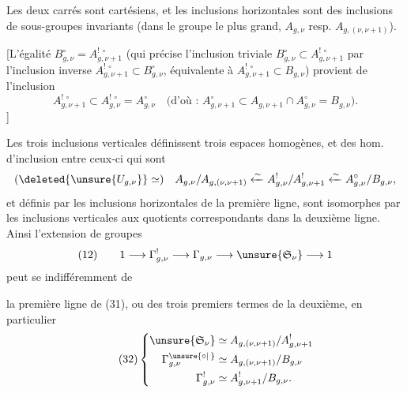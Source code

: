 
Les deux carrés sont cartésiens, et les inclusions horizontales  sont des inclusions de sous-groupes invariants  (dans le groupe le plus grand, $A_{g,\nu}$ resp. $A_{g,(\nu,\nu+1)}$).

[L'égalité $B_{g,\nu}^{\circ}=A_{g,\nu+1}^{!\,\circ}$  (qui précise l'inclusion triviale $B_{g,\nu}^{\circ}\subset A_{g,\nu+1}^{!\,\circ}$ par l'inclusion inverse $A_{g,\nu+1}^{!\,\circ}\subset B_{g,\nu}^{\circ}$, équivalente à $A_{g,\nu+1}^{!\,\circ}\subset B_{g,\nu}$) provient de l'inclusion
\[
A_{g,\nu+1}^{!\,\circ}\subset A_{g,\nu}^{!\,\circ}=A_{g,\nu}^{\circ}
\quad\text{(d'où : }A_{g,\nu+1}^{\circ}\subset A_{g,\nu+1}\cap A_{g,\nu}^{\circ}=B_{g,\nu}\text{).}
\]
]

Les trois inclusions verticales définissent trois espaces homogènes, et  des hom. d'inclusion entre ceux-ci qui sont 
\[
(\deleted{\unsure{U_{g,\nu}}}\simeq)\quad
A_{g,\nu}/A_{g,(\nu,\nu+1)}
\xleftarrow{\sim} A_{g,\nu}^{!}/A_{g,\nu+1}^{!}
\xleftarrow{\sim} A_{g,\nu}^{\circ}/B_{g,\nu},
\]
et    définis par les inclusions horizontales de la première ligne, sont isomorphes par les inclusions verticales aux quotients correspondants dans la deuxième ligne. Ainsi l'extension de groupes
\[
(12)\qquad 1\longrightarrow\Gamma_{g,\nu}^{!}\longrightarrow\Gamma_{g,\nu}\longrightarrow\unsure{\mathfrak S_\nu}\longrightarrow1
\]
peut  se  indifféremment de

la première ligne de (31), ou des trois premiers termes de la deuxième, en particulier
\[
\tag{32}
\left\{\begin{aligned}
\unsure{\mathfrak S_\nu}&\simeq A_{g,(\nu,\nu+1)}/A_{g,\nu+1}^{!}\\
\Gamma_{g,\nu}^{\unsure{\circ|\,}}&\simeq A_{g,(\nu,\nu+1)}/B_{g,\nu}\\
\Gamma_{g,\nu}^{!}&\simeq A_{g,\nu+1}^{!}/B_{g,\nu}.
\end{aligned}\right.
\]


